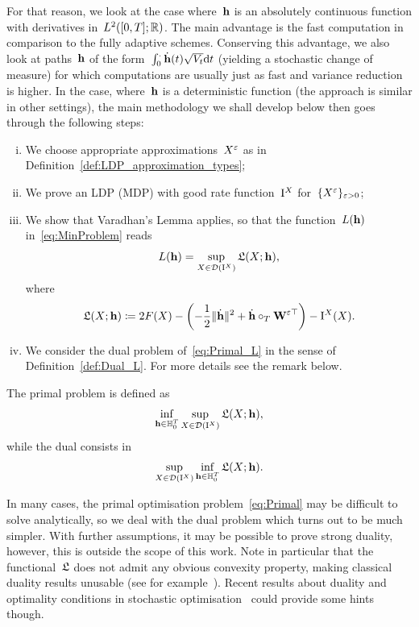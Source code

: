 For that reason, we look at the case where~$\boldsymbol{\mathrm{h}}$ is an absolutely continuous function with derivatives in~$L^2([0, T]; \mathbb{R})$.
The main advantage is the fast computation in comparison to the fully adaptive schemes. 
Conserving this advantage, we also look at paths~$\boldsymbol{\mathrm{h}}$ of the form~$\int_0^.\dot{\boldsymbol{\mathrm{h}}}(t)\sqrt{V_t}\mathrm{d} t$ (yielding a stochastic change of measure) for which computations are usually just as fast and variance reduction is higher. 
In the case, where~$\boldsymbol{\mathrm{h}}$ is a deterministic function 
(the approach is similar in other settings), 
the main methodology we shall develop below then goes through the following steps:
\begin{enumerate}[i)]
    \item We choose appropriate approximations~$X^{\varepsilon}$ as in Definition~\ref{def:LDP_approximation_types};
    \item We prove an LDP (MDP) with good rate function~$\mathrm{I}^{X}$ for~$\{X^\varepsilon\}_{\varepsilon>0}$;
    \item We show that Varadhan's Lemma applies, 
    so that the function~$L(\boldsymbol{\mathrm{h}})$ in~\eqref{eq:MinProblem} reads
    \begin{equation}\label{eq:Primal_L}
    L(\boldsymbol{\mathrm{h}}) = \sup_{X\in \mathcal{D}(\mathrm{I}^{X})} \mathfrak{L}(X;\boldsymbol{\mathrm{h}}),
    \end{equation}
where
\begin{equation}\label{eq:TargetFunc}
\mathfrak{L}(X;\boldsymbol{\mathrm{h}}) \coloneqq 2F(X) - \left(-\frac{1}{2}\|\dot{\boldsymbol{\mathrm{h}}}\|^2 + \dot{\boldsymbol{\mathrm{h}}}\circ_T\boldsymbol{\mathrm{W}}^{\varepsilon\top}\right) - \mathrm{I}^{X}(X).
    \end{equation}
    \item We consider the dual problem of~\eqref{eq:Primal_L} in the sense of Definition~\ref{def:Dual_L}. For more details see the remark below.
\end{enumerate}
\begin{definition}\label{def:Dual_L}
The primal problem is defined as
\begin{equation}\label{eq:Primal}
\inf_{\boldsymbol{\mathrm{h}}\in\mathbb{H}^T_0} \sup_{X\in \mathcal{D}(\mathrm{I}^{X})}\mathfrak{L}(X;\boldsymbol{\mathrm{h}}),
\end{equation}
while the dual consists in
\begin{equation}\label{eq:Dual}
\sup_{X\in \mathcal{D}(\mathrm{I}^{X})} \inf_{\boldsymbol{\mathrm{h}}\in\mathbb{H}^T_0} \mathfrak{L}(X;\boldsymbol{\mathrm{h}}).
\end{equation}
\end{definition}
\begin{remark}
In many cases, the primal optimisation problem~\eqref{eq:Primal} may be difficult to solve analytically, so we deal with the dual problem which turns out to be much simpler.
With further assumptions, it may be possible to prove strong duality, however, this is outside the scope of this work.
Note in particular that the functional~$\mathfrak{L}$
does not admit any obvious convexity property, making classical duality results unusable (see for example~\cite[Section~4]{Rockafellar1974ConjugateOptimization}).
Recent results about duality and optimality conditions in stochastic optimisation~\cite{Biagini2018DualityFinance, Pennanen2011ConvexFinance} could provide some hints though.
\end{remark}

